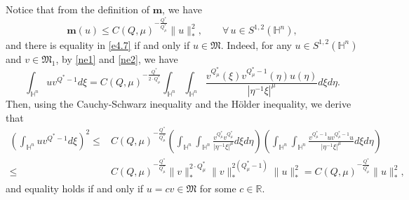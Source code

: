 \documentclass[11pt]{article}
\begin{document}
Notice that from the definition of $\mathbf{m}$, we have
\begin{equation}\label{e4.7}
 {\mathbf{m}(u)\leq C(Q,\mu)^{-\frac{Q^{\ast}}{Q^{\ast}_{\mu}}}\|u\|_*^2,\qquad \forall \, u\in S^{1,2}(\mathbb{H}^{n}),}
\end{equation}
and there is equality in \eqref{e4.7} if and only if $u\in \mathfrak{M}$. Indeed, for any $u\in S^{1,2}(\mathbb{H}^{n})$ and $v\in \mathfrak{M}_1$, by \eqref{ne1} and \eqref{ne2},
we have
\begin{equation*}
 \int_{\mathbb{H}^{n}} u v^{Q^{\ast}-1}d\xi=C(Q,\mu)^{-\frac{Q^{\ast}}{2\cdot Q^{\ast}_{\mu}}}
 \int_{\mathbb{H}^{n}}\int_{\mathbb{H}^{n}}
 \frac{v^{Q^{\ast}_{\mu}}(\xi)v^{Q^{\ast}_{\mu}-1}(\eta)u(\eta)}{|\eta^{-1}\xi|^{\mu}}d\xi{d}\eta.
\end{equation*}
Then, using
 the Cauchy-Schwarz inequality and the H\"{o}lder inequality, we derive that
\begin{align*}
 \left(\int_{\mathbb{H}^{n}} u v^{Q^{\ast}-1}d\xi\right)^2\leq& C(Q,\mu)^{-\frac{Q^{\ast}}{Q^{\ast}_{\mu}}}
 \left(\int_{\mathbb{H}^{n}}\int_{\mathbb{H}^{n}}
 \frac{v^{Q^{\ast}_{\mu}}v^{Q^{\ast}_{\mu}}}{|\eta^{-1}\xi|^{\mu}}d\xi{d}\eta\right)\left(\int_{\mathbb{H}^{n}}\int_{\mathbb{H}^{n}}
 \frac{v^{Q^{\ast}_{\mu}-1}uv^{Q^{\ast}_{\mu}-1}u}{|\eta^{-1}\xi|^{\mu}}d\xi{d}\eta\right)
 \\ \leq& C(Q,\mu)^{-\frac{Q^{\ast}}{Q^{\ast}_{\mu}}} \|v\|_*^{2\cdot Q^{\ast}_{\mu}}\|v\|_*^{2( Q^{\ast}_{\mu}-1)}\|u\|_*^{2}
 =C(Q,\mu)^{-\frac{Q^{\ast}}{Q^{\ast}_{\mu}}}\|u\|_*^{2},
\end{align*}
and equality holds if and only if $u=cv\in \mathfrak{M}$ for some $c\in \mathbb{R}$.
\end{document}
